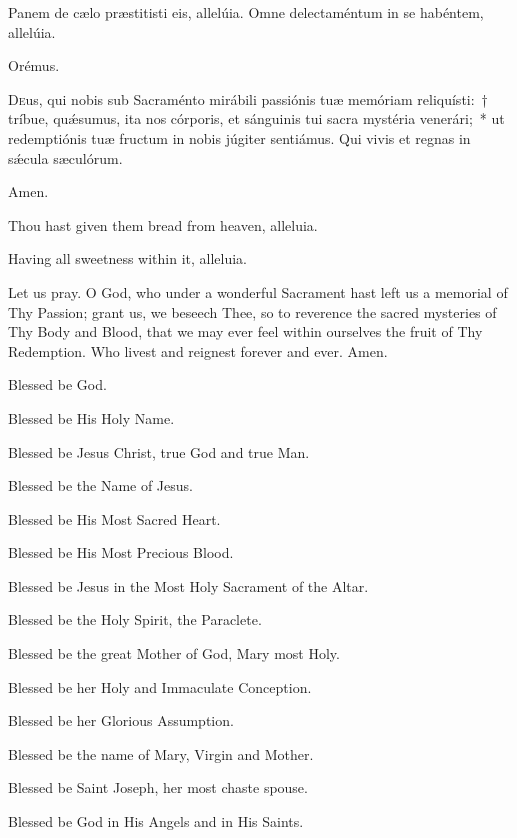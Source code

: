 \documentclass[11pt]{article}
\begin{document}
   \begin{paracol}{2}
   
\noindent \vv Panem de cælo præstitisti eis, allelúia.
\noindent \rr Omne dele\-ctaméntum in se habéntem, allelúia.
  
  Orémus.
  
  \lettrine{D}{e}us, qui nobis sub Sacraménto mirábili passiónis tuæ memóriam reliquísti:~† tríbue, quǽsumus, ita nos córporis, et sánguinis tui sacra mystéria venerári;~* ut redemptiónis tuæ fructum in nobis júgiter sentiámus. Qui vivis et regnas in sǽcula sæculórum. 
  
  \rr Amen.
  \switchcolumn
\begin{otherlanguage}{english}
\noindent \vv Thou hast given them bread from heaven, alleluia.

\noindent \rr Having all sweetness within it, alleluia.

\noindent Let us pray. O God, who under a wonderful Sacrament hast left us a memorial of Thy Passion; grant us, we beseech Thee, so to reverence the sacred mysteries of Thy Body and Blood, that we may ever feel within ourselves the fruit of Thy Redemption. Who livest and reignest forever and ever. Amen.

\end{otherlanguage}
\end{paracol}

\begin{multicols}{2}
\raggedcolumns
\begin{otherlanguage}{english}

Blessed be God. 

Blessed be His Holy Name. 

Blessed be Jesus Christ, true God and true Man.
 
Blessed be the Name of Jesus.

Blessed be His Most Sacred Heart.

Blessed be His Most Precious Blood.

Blessed be Jesus in the Most Holy Sacrament of the Altar.

Blessed be the Holy Spirit, the Paraclete.

Blessed be the great Mother of God, Mary most Holy.

Blessed be her Holy and Immaculate Conception.


Blessed be her Glorious Assumption.

Blessed be the name of Mary, Virgin and Mother.

Blessed be Saint Joseph, her most chaste spouse.

Blessed be God in His Angels and in His Saints.

\end{otherlanguage}
\end{multicols}
\end{document}
